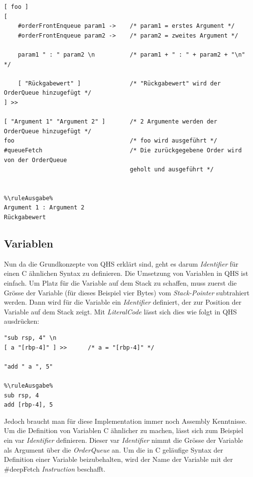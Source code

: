\begin{lstlisting}[language=QHS, caption=Verwendung von Parametern und Rückgabewert eines \textit{Identifiers}]
%\ruleEingabe%
[ foo ]
[
    #orderFrontEnqueue param1 ->    /* param1 = erstes Argument */
    #orderFrontEnqueue param2 ->    /* param2 = zweites Argument */

    param1 " : " param2 \n          /* param1 + " : " + param2 + "\n" */

    [ "Rückgabewert" ]              /* "Rückgabewert" wird der OrderQueue hinzugefügt */
] >>

[ "Argument 1" "Argument 2" ]       /* 2 Argumente werden der OrderQueue hinzugefügt */
foo                                 /* foo wird ausgeführt */
#queueFetch                         /* Die zurückgegebene Order wird von der OrderQueue
                                    geholt und ausgeführt */


%\ruleAusgabe%
Argument 1 : Argument 2
Rückgabewert
\end{lstlisting}


\subsection{Variablen} \label{sec:qhs-vars}
Nun da die Grundkonzepte von QHS erklärt sind, geht es darum \textit{Identifier} für einen C ähnlichen Syntax zu definieren.
Die Umsetzung von Variablen in QHS ist einfach.
Um Platz für die Variable auf dem Stack zu schaffen, muss zuerst die Grösse der Variable (für dieses Beispiel vier Bytes) vom \textit{Stack-Pointer} subtrahiert werden.
Dann wird für die Variable ein \textit{Identifier} definiert, der zur Position der Variable auf dem Stack zeigt.
Mit \textit{LiteralCode} lässt sich dies wie folgt in QHS ausdrücken:

\begin{lstlisting}[language=QHS, caption=Definition einer Variable mit \textit{LiteralCode}]
%\ruleEingabe%
"sub rsp, 4" \n
[ a "[rbp-4]" ] >>      /* a = "[rbp-4]" */

"add " a ", 5"

%\ruleAusgabe%
sub rsp, 4
add [rbp-4], 5
\end{lstlisting}

Jedoch braucht man für diese Implementation immer noch Assembly Kenntnisse.
Um die Definition von Variablen C ähnlicher zu machen, lässt sich zum Beispiel ein {\selectListingFont var} \textit{Identifier} definieren.
Dieser {\selectListingFont var} \textit{Identifier} nimmt die Grösse der Variable als Argument über die \textit{OrderQueue} an. Um die in C geläufige Syntax der Definition einer Variable beizubehalten,
wird der Name der Variable mit der {\listingFont\selectfont \#deepFetch} \textit{Instruction} beschafft.

